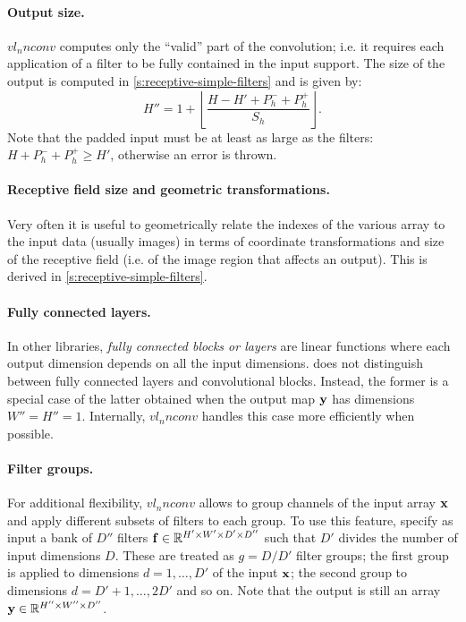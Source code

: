 \paragraph{Output size.} $vl_nnconv$ computes only the ``valid'' part of the convolution; i.e. it requires each application of a filter to be fully contained in the input support.  The size of the output is computed in \cref{s:receptive-simple-filters} and is given by:
\[
H'' = 1 + \left\lfloor \frac{H - H' + P_h^- + P_h^+}{S_h} \right\rfloor.
\]
Note that the padded input must be at least as large as the filters: $H +P_h^- + P_h^+ \geq H'$, otherwise an error is thrown.

\paragraph{Receptive field size and geometric transformations.} Very often it is useful to geometrically relate the indexes of the various array to the input data (usually images) in terms of coordinate transformations and size of the receptive field (i.e. of the image region that affects an output). This is derived in \cref{s:receptive-simple-filters}.

\paragraph{Fully connected layers.} In other libraries, \emph{fully connected blocks or layers} are linear functions where each output dimension depends on all the input dimensions. \matconvnet does not distinguish between fully connected layers and convolutional blocks. Instead, the former is a special case of the latter obtained when the output map $\mathbf{y}$ has dimensions $W''=H''=1$. Internally, $vl_nnconv$ handles this case more efficiently when possible.

\paragraph{Filter groups.} For additional flexibility, $vl_nnconv$ allows to group channels of the input array $\mathbf{x}$ and apply different subsets of filters to each group. To use this feature, specify as input a bank  of $D''$ filters $\mathbf{f}\in\mathbb{R}^{H'\times W'\times D'\times D''}$ such that $D'$ divides the number of input dimensions $D$. These are treated as $g=D/D'$ filter groups; the first group is applied to dimensions $d=1,\dots,D'$ of the input $\mathbf{x}$; the second group to dimensions $d=D'+1,\dots,2D'$ and so on. Note that the output is still an array $\mathbf{y}\in\mathbb{R}^{H''\times W''\times D''}$.

